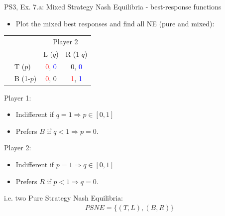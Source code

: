 \begin{frame}{PS3, Ex. 7.a: Mixed Strategy Nash Equilibria - best-response functions}
  \begin{multicols}{2}
    \begin{itemize}
      \item[(a)] Plot the mixed best responses and find all NE (pure and mixed):
    \end{itemize}
    \begin{table}
      \begin{tabular}{cl|c|c|}
        & \multicolumn{1}{c}{} & \multicolumn{2}{c}{\color{blue}Player 2}\\
        \parbox[t]{1mm}{}
          &  &  &  \\
          & T  ($p$)  & \textcolor{red}{0}, \textcolor{blue}{0} & 0, \textcolor{blue}{0} \\
          & B  (1-$p$)& \textcolor{red}{0}, 0 & \textcolor{red}{1}, \textcolor{blue}{1} \\
      \end{tabular}
    \end{table}
    Player 1:
    \begin{itemize}
      \item Indifferent if $q=1\Rightarrow p\in[0,1]$
      \item Prefers $B$ if $q<1\Rightarrow p=0$.
    \end{itemize}
    Player 2:
    \begin{itemize}
      \item Indifferent if $p=1\Rightarrow q\in[0,1]$
      \item Prefers $R$ if $p<1\Rightarrow q=0$.
    \end{itemize}
    i.e. two Pure Strategy Nash Equilibria:
    \begin{align*}
      PSNE=\{(T,L),(B,R)\}
    \end{align*}
  \vfill\null \columnbreak
  \vfill\null
  \end{multicols}
\end{frame}
